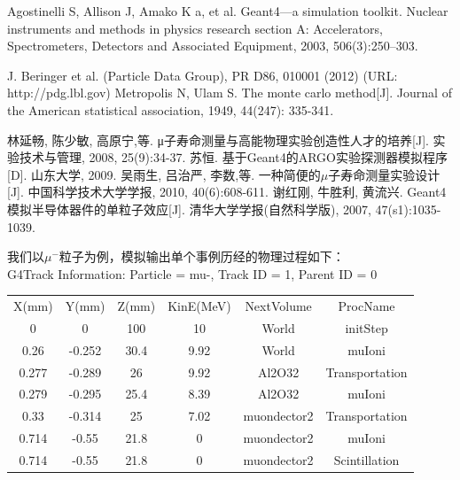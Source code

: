 \documentclass[aps,prd,superscriptaddress,nofootinbib,preprint]{ctexart}
\begin{document}
\begin{CJK}{UTF8}{gbsn}
\begin{thebibliography}{123456}
 Agostinelli S, Allison J, Amako K a, et al. Geant4—a simulation toolkit. Nuclear instruments and methods in physics research section A: Accelerators, Spectrometers, Detectors and Associated Equipment, 2003, 506(3):250–303.

J. Beringer et al. (Particle Data Group), PR D86, 010001 (2012) (URL: http://pdg.lbl.gov)
Metropolis N, Ulam S. The monte carlo method[J]. Journal of the American statistical association, 1949, 44(247): 335-341.

林延畅, 陈少敏, 高原宁,等. μ子寿命测量与高能物理实验创造性人才的培养[J]. 实验技术与管理, 2008, 25(9):34-37.
苏恒. 基于Geant4的ARGO实验探测器模拟程序[D]. 山东大学, 2009.
吴雨生, 吕治严, 李数,等. 一种简便的$\mu$子寿命测量实验设计[J]. 中国科学技术大学学报, 2010, 40(6):608-611.
谢红刚, 牛胜利, 黄流兴. Geant4模拟半导体器件的单粒子效应[J]. 清华大学学报(自然科学版), 2007, 47(s1):1035-1039.

\end{thebibliography}


\newpage

我们以$\mu^-$粒子为例，模拟输出单个事例历经的物理过程如下：\\
G4Track Information: Particle = mu-, Track ID = 1,  Parent ID = 0\\
\begin{center}
\begin{tabular}{|c|c|c|c|c|c|}
 X(mm) & Y(mm) & Z(mm) & KinE(MeV)  & NextVolume & ProcName\\
 0    &  0      &  100  &  10   &       World &  initStep\\
 0.26 & -0.252  &  30.4 & 9.92  &        World &  muIoni\\
0.277  & -0.289 &   26 &  9.92  &   Al2O32 & Transportation\\
0.279 & -0.295  &  25.4 & 8.39  &     Al2O32  & muIoni\\
0.33 & -0.314  &    25 &  7.02 &    muondector2  & Transportation\\
0.714 &  -0.55 &  21.8 &  0    &    muondector2  & muIoni\\
0.714 & -0.55  &   21.8 &  0     & muondector2 & Scintillation

\end{tabular}
\end{center}



\end{CJK}
\end{document}
